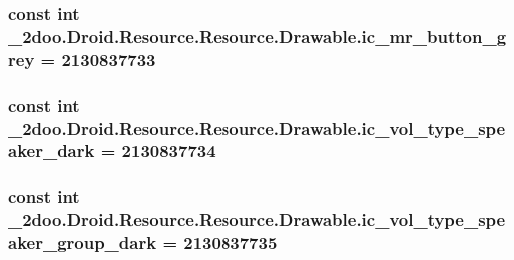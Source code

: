 \hypertarget{class__2doo_1_1_droid_1_1_resource_1_1_drawable_6c9c19c59756879822a874f28a230f06}{
\subsubsection[{ic\_\-mr\_\-button\_\-grey}]{\setlength{\rightskip}{0pt plus 5cm}const int \_\-2doo.Droid.Resource.Resource.Drawable.ic\_\-mr\_\-button\_\-grey = 2130837733}}
\label{class__2doo_1_1_droid_1_1_resource_1_1_drawable_6c9c19c59756879822a874f28a230f06}


\hypertarget{class__2doo_1_1_droid_1_1_resource_1_1_drawable_856248d4c415ab66c7aa7ae711485b8c}{
\subsubsection[{ic\_\-vol\_\-type\_\-speaker\_\-dark}]{\setlength{\rightskip}{0pt plus 5cm}const int \_\-2doo.Droid.Resource.Resource.Drawable.ic\_\-vol\_\-type\_\-speaker\_\-dark = 2130837734}}
\label{class__2doo_1_1_droid_1_1_resource_1_1_drawable_856248d4c415ab66c7aa7ae711485b8c}


\hypertarget{class__2doo_1_1_droid_1_1_resource_1_1_drawable_b36bc18bbfeef4210d4920a4a6f534c2}{
\subsubsection[{ic\_\-vol\_\-type\_\-speaker\_\-group\_\-dark}]{\setlength{\rightskip}{0pt plus 5cm}const int \_\-2doo.Droid.Resource.Resource.Drawable.ic\_\-vol\_\-type\_\-speaker\_\-group\_\-dark = 2130837735}}
\label{class__2doo_1_1_droid_1_1_resource_1_1_drawable_b36bc18bbfeef4210d4920a4a6f534c2}


